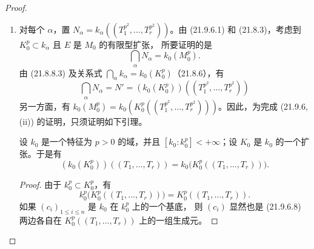 \begin{proof}
\begin{enumerate}
  得到
  \[
    d(E/L_0,k/k_0)=d(E/K_0,k/k_0)=d(E/M_0,k/k_0),
  \]
  最后应用一次 (21.6.4.2)，便有
  \[
    \delta=d(E/M_0,N/k_0),
  \]
  这就证明了 (21.9.6.1)。此外，当把 $k$ 换成一个子扩张 $k'$（属于
  $k_0$）时，$N$ 被换成它的一个子扩张 $N'$，因而
  $d(E/M_0,N'/k_0)\leqslant d(E/M_0,N/k_0)$（21.6.4.2）；这证明了 (i) 的
  最后一项断言。

  \item[(ii)] 对每个 $\alpha$，置
  $N_\alpha=k_\alpha((T_1^{p^2},\ldots,T_r^{p^2}))$。由 (21.9.6.1) 和
  (21.8.3)，考虑到 $K_0^p\subset k_\alpha$ 且 $E$ 是 $M_0$ 的有限型扩张，
  所要证明的是
  \[
    \bigcap_\alpha N_\alpha=k_0(M_0^p).
  \]
  由 (21.8.8.3) 及关系式
  $\bigcap_\alpha k_\alpha=k_0(K_0^p)$（21.8.6），有
  \begin{equation}
  \tag{21.9.6.6}
  \label{0.21.9.6.6-fr}
    \bigcap_\alpha N_\alpha=N'
    =(k_0(K_0^p))((T_1^{p^2},\ldots,T_r^{p^2}))
  \end{equation}
  另一方面，有
  $k_0(M_0^p)=k_0(K_0^p((T_1^{p^2},\ldots,T_r^{p^2})))$。因此，为完成
  (21.9.6, (ii)) 的证明，只须证明如下引理。

  \begin{lemma}[21.9.6.7]
  \label{0.21.9.6.7-fr}
  设 $k_0$ 是一个特征为 $p>0$ 的域，并且
  $[k_0:k_0^p]<+\infty$；设 $K_0$ 是 $k_0$ 的一个扩张。于是有
  \begin{equation}
  \tag{21.9.6.8}
  \label{0.21.9.6.8-fr}
    (k_0(K_0^p))((T_1,\ldots,T_r))
    =k_0\bigl(K_0^p((T_1,\ldots,T_r))\bigr).
  \end{equation}
  \end{lemma}

  \begin{proof}
  由于 $k_0^p\subset K_0^p$，有
  \[
    k_0^p\bigl(K_0^p((T_1,\ldots,T_r))\bigr)
    =K_0^p((T_1,\ldots,T_r)).
  \]
  如果 $(c_i)_{1\leqslant i\leqslant n}$ 是 $k_0$ 在 $k_0^p$ 上的一个基底，
  则 $(c_i)$ 显然也是 (21.9.6.8) 两边各自在
  $K_0^p((T_1,\ldots,T_r))$ 上的一组生成元。
  \end{proof}
\end{enumerate}
\end{proof}

